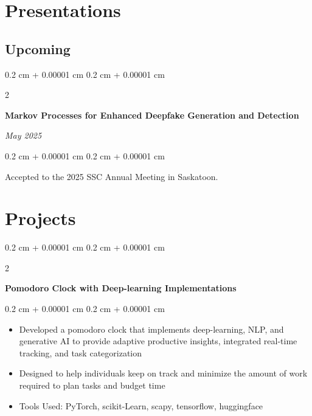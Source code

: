 \documentclass[10pt, letterpaper]{article}
\newenvironment{highlights}{
    \begin{itemize}[
        topsep=0.10 cm,
        parsep=0.10 cm,
        partopsep=0pt,
        itemsep=0pt,
        leftmargin=0.4 cm + 10pt
    ]
}{
    \end{itemize}
} %
\newenvironment{onecolentry}{
    \begin{adjustwidth}{
        0.2 cm + 0.00001 cm
    }{
        0.2 cm + 0.00001 cm
    }
}{
    \end{adjustwidth}
} %
\newenvironment{twocolentry}[2][]{
    \onecolentry
    \def\secondColumn{#2}
    \setcolumnwidth{\fill, 4.5 cm}
    \begin{paracol}{2}
}{
    \switchcolumn \raggedleft \secondColumn
    \end{paracol}
    \endonecolentry
} %
\let\hrefWithoutArrow\href
\renewcommand{\href}[2]{\hrefWithoutArrow{#1}{\ifthenelse{\equal{#2}{}}{ }{#2 }\raisebox{.15ex}{\footnotesize \faExternalLink*}}}
\begin{document}
    \section{Presentations}
    \subsection{Upcoming}
    \begin{twocolentry}{   
            
        \textit{May 2025}}
            \textbf{Markov Processes for Enhanced Deepfake Generation and
            Detection}
        \end{twocolentry}

        \vspace{0.10 cm}
    \begin{onecolentry}
        Accepted to the 2025 SSC Annual Meeting in Saskatoon.
    \end{onecolentry}



    
    \section{Projects}



        
        \begin{twocolentry}{
            
            
        \textit{\href{https://github.com/IanZhang42/pomodoroclock.git}{GitHub}}}
            \textbf{Pomodoro Clock with Deep-learning Implementations}
        \end{twocolentry}

        \vspace{0.10 cm}
        \begin{onecolentry}
            \begin{highlights}
                \item Developed a pomodoro clock that implements deep-learning, NLP, and generative AI to provide adaptive productive insights, integrated real-time tracking, and task categorization
                \item Designed to help individuals keep on track and minimize the amount of work required to plan tasks and budget time
                \item Tools Used: PyTorch, scikit-Learn, scapy, tensorflow, huggingface
            \end{highlights}
        \end{onecolentry}
\end{document}

